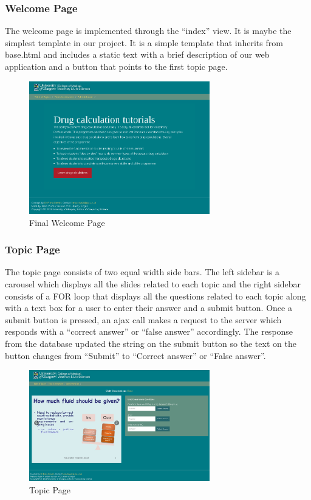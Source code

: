 \documentclass{l3proj}
\begin{document}
{\subsubsection{Welcome Page}
The welcome page is implemented through the “index” view.  It is maybe the simplest template in our project. It is a simple template that inherits from base.html and includes a static text with a brief description of our web application and a button that points to the first topic page.
\begin{figure}[h!]
   \caption{Final Welcome Page}
   \centering
     \includegraphics[width=0.7\textwidth]{images/welcomePage.png}
\end{figure} 

\subsubsection{Topic Page}
The topic page consists of two equal width side bars. The left sidebar is a carousel which displays all the slides related to each topic and the right sidebar  consists of a FOR loop that displays all the questions related to each topic along with a text box for a user to enter their answer and a submit button. Once a submit button is pressed, an ajax call makes a request to the server which responds with a “correct answer” or “false answer” accordingly.  The response from the database updated the string on the submit button so the text on the button changes from “Submit” to “Correct answer” or “False answer”.
\begin{figure}[h!]
   \caption{Topic Page}
   \centering
     \includegraphics[width=0.7\textwidth]{images/topicPage.png}
\end{figure} 

}
\end{document}
